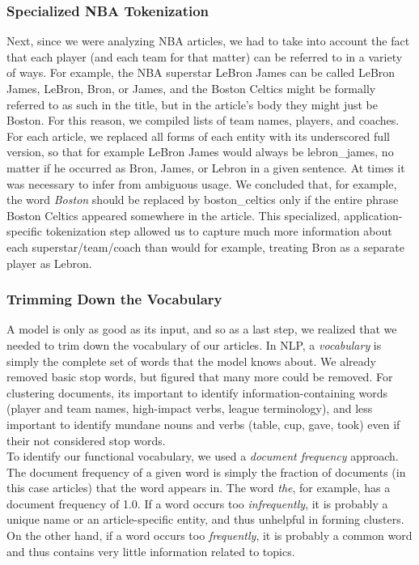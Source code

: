 \documentclass[11pt]{article}
\begin{document}
\subsubsection{Specialized NBA Tokenization}
Next, since we were analyzing NBA articles, we had to take into account the fact that each player (and each team for that matter) can be referred to in a variety of ways. For example, the NBA superstar LeBron James can be called LeBron James, LeBron, Bron, or James, and the Boston Celtics might be formally referred to as such in the title, but in the article's body they might just be Boston. For this reason, we compiled lists of team names, players, and coaches.  For each article, we replaced all forms of each entity with its underscored full version, so that for example LeBron James would always be lebron\_james, no matter if he occurred as Bron, James, or Lebron in a given sentence.  At times it was necessary to infer from ambiguous usage. We concluded that, for example, the word \textit{Boston} should be replaced by boston\_celtics only if the entire phrase Boston Celtics appeared somewhere in the article.  This specialized, application-specific tokenization step allowed us to capture much more information about each superstar/team/coach than would for example, treating Bron as a separate player as Lebron. \\

\subsubsection{Trimming Down the Vocabulary}
A model is only as good as its input, and so as a last step, we realized that we needed to trim down the vocabulary of our articles. In NLP, a \textit{vocabulary} is simply the complete set of words that the model knows about.  We already removed basic stop words, but figured that many more could be removed. For clustering documents, its important to identify information-containing words (player and team names, high-impact verbs, league terminology), and less important to identify mundane nouns and verbs (table, cup, gave, took) even if their not considered stop words. \\

To identify our functional vocabulary, we used a \textit{document frequency} approach. The document frequency of a given word is simply the fraction of documents (in this case articles) that the word appears in. The word \textit{the}, for example, has a document frequency of 1.0. If a word occurs too \textit{infrequently}, it is probably a unique name or an article-specific entity, and thus unhelpful in forming clusters. On the other hand, if a word occurs too \textit{frequently}, it is probably a common word and thus contains very little information related to topics.  \\
\end{document}
